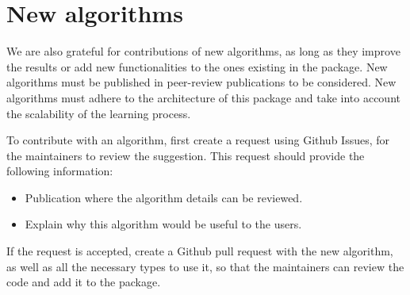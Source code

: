 \documentclass[letterpaper,10pt,english]{sphinxmanual}
\begin{document}
\section{New algorithms}
\label{\detokenize{package/contributors:new-algorithms}}
We are also grateful for contributions of new algorithms, as long as they improve the results or add new functionalities to the ones existing in the package.
New algorithms must be published in peer-review publications to be considered. New algorithms must adhere to the architecture of this package and
take into account the scalability of the learning process.

To contribute with an algorithm, first create a request using Github Issues, for the maintainers to review the suggestion. This request should provide the following information:
\begin{itemize}
\item {} 
Publication where the algorithm details can be reviewed.

\item {} 
Explain why this algorithm would be useful to the users.

\end{itemize}

If the request is accepted, create a Github pull request with the new algorithm, as well as all the necessary types to use it, so that the maintainers can review the
code and add it to the package.


\renewcommand{\indexname}{Index}
\printindex
\end{document}
